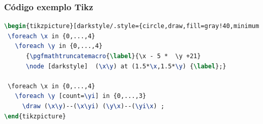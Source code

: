\begin{frame}[fragile]
\frametitle{Código exemplo Tikz}
\begin{lstlisting}[language=tex, label=lst-tikz, caption={Código utilizado para criar o exemplo em tikz.}, postbreak=\mbox{$\hookrightarrow$\space}, basicstyle=\fontsize{8}{10}\selectfont\ttfamily]
\begin{tikzpicture}[darkstyle/.style={circle,draw,fill=gray!40,minimum size=20}]
 \foreach \x in {0,...,4}
   \foreach \y in {0,...,4} 
      {\pgfmathtruncatemacro{\label}{\x - 5 *  \y +21}
      \node [darkstyle]  (\x\y) at (1.5*\x,1.5*\y) {\label};} 

 \foreach \x in {0,...,4}
   \foreach \y [count=\yi] in {0,...,3}  
     \draw (\x\y)--(\x\yi) (\y\x)--(\yi\x) ;
\end{tikzpicture}
\end{lstlisting}
\end{frame}


